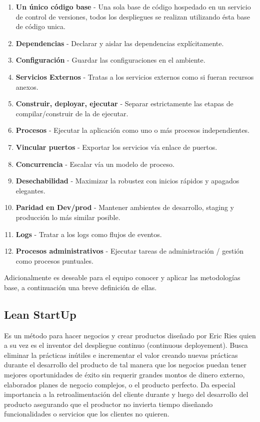\documentclass[conference]{IEEEtran}
\begin{document}
\begin{enumerate}
 \item {\bf Un único código base} - Una sola base de código hospedado en un servicio de control de versiones, todos los despliegues se realizan utilizando ésta base de código unica.
 \item {\bf Dependencias} - Declarar y aislar las dependencias explícitamente.
 \item {\bf Configuración} - Guardar las configuraciones en el ambiente.
 \item {\bf Servicios Externos} - Tratas a los servicios externos como si fueran recursos anexos.
 \item {\bf Construir, deployar, ejecutar} - Separar estrictamente las etapas de compilar/construir de la de ejecutar.
 \item {\bf Procesos} - Ejecutar la aplicación como uno o más procesos independientes.
 \item {\bf Vincular puertos} - Exportar los servicios vía enlace de puertos.
 \item {\bf Concurrencia} - Escalar vía un modelo de proceso.
 \item {\bf Desechabilidad} - Maximizar la robustez con inicios rápidos y apagados elegantes.
 \item {\bf Paridad en Dev/prod} - Mantener ambientes de desarrollo, staging y producción lo más similar posible.
 \item {\bf Logs} - Tratar a los logs como flujos de eventos.
 \item {\bf Procesos administrativos} - Ejecutar tareas de administración / gestión como procesos puntuales.
\end{enumerate}

Adicionalmente es deseable para el equipo conocer y aplicar las metodologías base, a continuación una breve definición de ellas.

\subsection{Lean StartUp}

Es un método para hacer negocios y crear productos diseñado por Eric Ries quien a su vez es el inventor del despliegue continuo (continuous deployement). Busca eliminar la prácticas inútiles e incrementar el valor creando nuevas prácticas durante el desarrollo del producto de tal manera que los negocios puedan tener mejores oportunidades de éxito sin requerir grandes montos de dinero externo, elaborados planes de negocio complejos, o el producto perfecto. Da especial importancia a la retroalimentación del cliente durante y luego del desarrollo del producto asegurando que el productor no invierta tiempo diseñando funcionalidades o servicios que los clientes no quieren.
\end{document}
